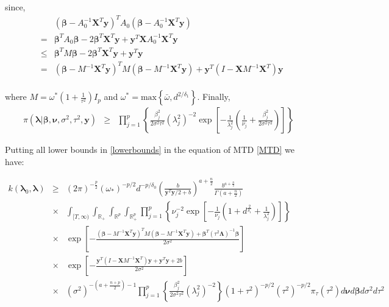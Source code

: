 \documentclass[noinfoline,11pt]{imsart}
\numberwithin{equation}{section}
\theoremstyle{plain}
\newcommand{\y}{\mathbf{y}}
\newcommand{\X}{\mathbf{X}}
\newcommand{\bl}{\boldsymbol{\lambda}}
\newcommand{\Bl}{\boldsymbol{\Lambda}}
\begin{document}
\noindent
since, \begin{eqnarray*}
    & & \left(\boldsymbol{\beta}-A_0^{-1}\X^T\y\right)^T A_0\left(\boldsymbol{\beta}-A_0^{-1}\X^T\y\right) \nonumber \\
    &=& \boldsymbol{\beta}^T A_0\boldsymbol{\beta}-2\boldsymbol{\beta}^T\X^T\y+\y^T\X A_0^{-1}\X^T\y\nonumber \\
    &\leq& \boldsymbol{\beta}^T M\boldsymbol{\beta}-2\boldsymbol{\beta}^T\X^T\y+\y^T\y\nonumber \\
    &=&\left(\boldsymbol{\beta}-M^{-1}\X^T\y\right)^T M\left(\boldsymbol{\beta}-M^{-1}\X^T\y\right)+\y^T\left(I-\X M^{-1}\X^T\right)\y\nonumber \\
\end{eqnarray*}

\noindent
where $M=\omega^*\left(1+\frac{1}{\tau^2}\right)I_p$ and  $\omega^*=\text{max}\left\{\bar{\omega},d^{2/\delta_1}\right\}$.
Finally, 
\begin{eqnarray}\label{lowerbounds}
    \pi\left(\left.\bl\right|\boldsymbol{\beta,\nu},\sigma^2,\tau^2,\y\right) &\geq&  \prod_{j=1}^p\left\{\frac{\beta_j^2}{2\sigma^2\tau^2}\left(\lambda_j^2\right)^{-2}\exp{\left[-\frac{1}{\lambda_j^2}\left(\frac{1}{\nu_j}+\frac{\beta_j^2}{2\sigma^2\tau^2}\right)\right]}\right\} 
\end{eqnarray}
  
\noindent


Putting all lower bounds in \eqref{lowerbounds} in the equation of MTD \eqref{MTD} we have:

\begin{eqnarray*}\label{minorizationproof}
k\left(\bl_0,\bl\right) 
&\geq& \left(2\pi\right)^{-\frac{p}{2}}\left(\omega_*\right)^{-p/2}d^{-p/\delta_0}\left(\frac{b}{\y^T\y/2+b}\right)^{a+\frac{n}{2}}\frac{b^{a+\frac{n}{2}}}{\Gamma\left(a+\frac{n}{2}\right)} \nonumber \\ 
&\times& \int_{[T,\infty)}\int_{\mathbb{R}_+}\int_{\mathbb{R}^p}\int_{\mathbb{R}_+^p}\prod_{j=1}^p\left\{\nu_j^{-2}\exp{\left[-\frac{1}{\nu_j}\left(1+d^{\frac{2}{\delta_1}}+\frac{1}{\lambda_j^2}\right)\right]}\right\}\nonumber \\
&\times& \exp{\left[-\frac{\left(\boldsymbol{\beta}-M^{-1}\X^T\y\right)^T M\left(\boldsymbol{\beta}-M^{-1}\X^T\y\right)+\boldsymbol{\beta}^T\left(\tau^2\Bl\right)^{-1}\boldsymbol{\beta}}{2\sigma^2}\right]}\nonumber \\
&\times&\exp{\left[-\frac{\y^T\left(I-\X M^{-1}\X^T\right)\y+\y^T\y+2b}{2\sigma^2}\right]} \nonumber \\
&\times& \left(\sigma^2\right)^{-\left(a+\frac{n+p}{2}\right)-1}\prod_{j=1}^p\left\{\frac{\beta_j^2}{2\sigma^2\tau^2}\left(\lambda_j^2\right)^{-2}\right\}\left(1+\tau^2\right)^{-p/2}\left(\tau^2\right)^{-p/2}\pi_\tau\left(\tau^2\right)d\boldsymbol{\nu}d\boldsymbol{\beta}d\sigma^2d\tau^2\nonumber \\
\end{eqnarray*}
\end{document}
